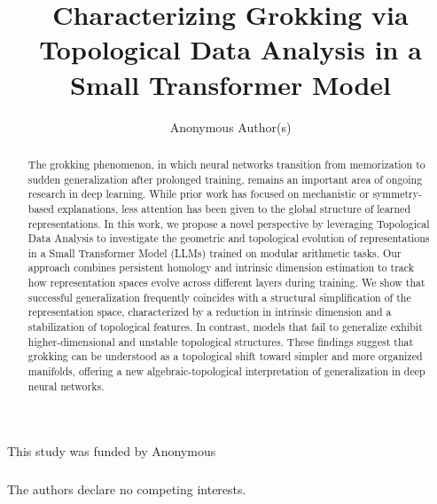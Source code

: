 \documentclass[runningheads]{llncs.cls}
\begin{document}
\title{Characterizing Grokking via Topological Data Analysis in a Small Transformer Model}

%
    \author{Anonymous Author(s)}



%
\maketitle              

\begin{abstract}
The grokking phenomenon, in which neural networks transition from memorization to sudden generalization after prolonged training, remains an important area of ongoing research in deep learning. While prior work has focused on mechanistic or symmetry-based explanations, less attention has been given to the global structure of learned representations. In this work, we propose a novel perspective by leveraging Topological Data Analysis to investigate the geometric and topological evolution of representations in a Small Transformer Model (LLMs) trained on modular arithmetic tasks. Our approach combines persistent homology and intrinsic dimension estimation to track how representation spaces evolve across different layers during training. We show that successful generalization frequently coincides with a structural simplification of the representation space, characterized by a reduction in intrinsic dimension and a stabilization of topological features. In contrast, models that fail to generalize exhibit higher-dimensional and unstable topological structures. These findings suggest that grokking can be understood as a topological shift toward simpler and more organized manifolds, offering a new algebraic-topological interpretation of generalization in deep neural networks.
\end{abstract}

%
%
%
%
%
%








\begin{credits}
\subsubsection{\ackname} This study was funded by Anonymous %

\subsubsection{\discintname}
The authors declare no competing interests.
\end{credits}



\end{document}
